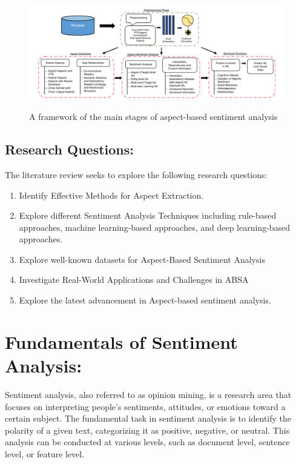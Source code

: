 \documentclass{article}
\begin{document}
\begin{figure}
    \centering
    \includegraphics[width=1\linewidth]{asba.png}
    \caption{A framework of the main stages of aspect-based sentiment analysis}
    \label{fig: ASBA process}
    \cite{NazirIssues&Chall2023}
\end{figure}


\subsection{Research Questions: }
The literature review seeks to explore the following research questions:
\begin{enumerate}
  \item Identify Effective Methods for Aspect Extraction.
  \item Explore different Sentiment Analysis Techniques including rule-based approaches, machine learning-based approaches, and deep learning-based approaches.
  \item Explore well-known datasets for Aspect-Based Sentiment Analysis
  \item Investigate Real-World Applications and Challenges in ABSA
  \item Explore the latest advancement in Aspect-based sentiment analysis.
  
\end{enumerate}

\section{Fundamentals of Sentiment Analysis: }
Sentiment analysis, also referred to as opinion mining, is a research area that focuses on interpreting people's sentiments, attitudes, or emotions toward a certain subject\cite{NazirIssues&Chall2023}. The fundamental task in sentiment analysis is to identify the polarity of a given text, categorizing it as positive, negative, or neutral. This analysis can be conducted at various levels, such as document level, sentence level, or feature level.\cite{doi:10.1504/IJESMS.2021.119892}
\end{document}

